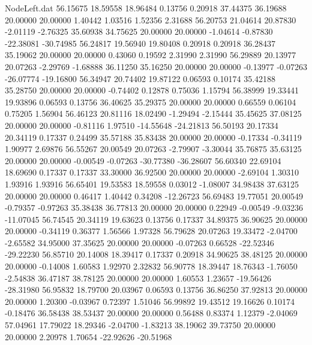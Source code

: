 \begin{filecontents}{NodeLeft.dat}
  56.15675   18.59558   18.96484     0.13756    0.20918   37.44375   36.19688   20.00000   20.00000    1.40442    1.03516    1.52356    2.31688
  56.20753   21.04614   20.87830    -2.01119   -2.76325   35.60938   34.75625   20.00000   20.00000   -1.04614   -0.87830  -22.38081  -30.74985
  56.24817   19.56940   19.80408     0.20918    0.20918   36.28437   35.19062   20.00000   20.00000    0.43060    0.19592    2.31990    2.31990
  56.29889   20.13977   20.07263    -2.29769   -1.68888   36.11250   35.16250   20.00000   20.00000   -0.13977   -0.07263  -26.07774  -19.16800
  56.34947   20.74402   19.87122     0.06593    0.10174   35.42188   35.28750   20.00000   20.00000   -0.74402    0.12878    0.75036    1.15794
  56.38999   19.33441   19.93896     0.06593    0.13756   36.40625   35.29375   20.00000   20.00000    0.66559    0.06104    0.75205    1.56904
  56.46123   20.81116   18.02490    -1.29494   -2.15444   35.45625   37.08125   20.00000   20.00000   -0.81116    1.97510  -14.55648  -24.21813
  56.50193   20.17334   20.34119     0.17337    0.24499   35.57188   35.83438   20.00000   20.00000   -0.17334   -0.34119    1.90977    2.69876
  56.55267   20.00549   20.07263    -2.79907   -3.30044   35.76875   35.63125   20.00000   20.00000   -0.00549   -0.07263  -30.77380  -36.28607
  56.60340   22.69104   18.69690     0.17337    0.17337   33.30000   36.92500   20.00000   20.00000   -2.69104    1.30310    1.93916    1.93916
  56.65401   19.53583   18.59558     0.03012   -1.08007   34.98438   37.63125   20.00000   20.00000    0.46417    1.40442    0.34208  -12.26723
  56.69483   19.77051   20.00549    -0.79357   -0.97263   35.38438   36.77813   20.00000   20.00000    0.22949   -0.00549   -9.03236  -11.07045
  56.74545   20.34119   19.63623     0.13756    0.17337   34.89375   36.90625   20.00000   20.00000   -0.34119    0.36377    1.56566    1.97328
  56.79628   20.07263   19.33472    -2.04700   -2.65582   34.95000   37.35625   20.00000   20.00000   -0.07263    0.66528  -22.52346  -29.22230
  56.85710   20.14008   18.39417     0.17337    0.20918   34.90625   38.48125   20.00000   20.00000   -0.14008    1.60583    1.92970    2.32832
  56.90778   18.39447   18.76343    -1.76050   -2.54838   36.47187   38.78125   20.00000   20.00000    1.60553    1.23657  -19.56426  -28.31980
  56.95832   18.79700   20.03967     0.06593    0.13756   36.86250   37.92813   20.00000   20.00000    1.20300   -0.03967    0.72397    1.51046
  56.99892   19.43512   19.16626     0.10174   -0.18476   36.58438   38.53437   20.00000   20.00000    0.56488    0.83374    1.12379   -2.04069
  57.04961   17.79022   18.29346    -2.04700   -1.83213   38.19062   39.73750   20.00000   20.00000    2.20978    1.70654  -22.92626  -20.51968

\end{filecontents}
